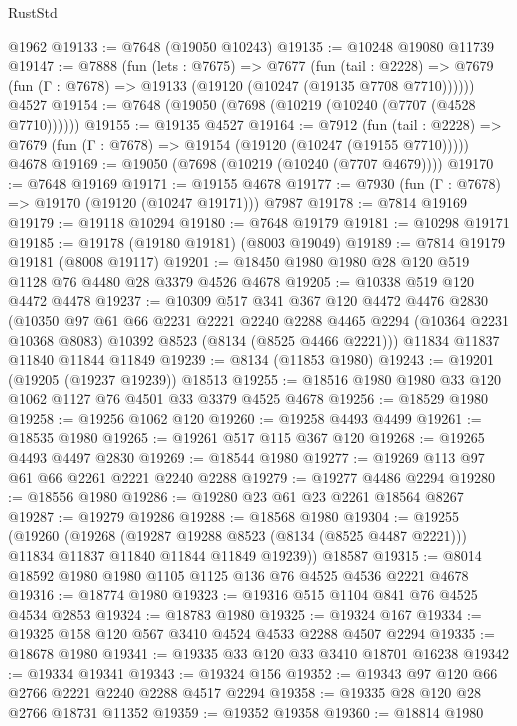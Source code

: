 \begin{lexlean}{RustStd}
\begin{coremodule}
    @1962
@19133 := @7648 (@19050 @10243)
@19135 := @10248 @19080 @11739
@19147 := @7888
    (fun (lets : @7675) =>
    @7677
      (fun (tail : @2228) =>
      @7679 (fun (Γ : @7678) => @19133 (@19120 (@10247 (@19135 @7708 @7710))))))
    @4527
@19154 := @7648 (@19050 (@7698 (@10219 (@10240 (@7707 (@4528 @7710))))))
@19155 := @19135 @4527
@19164 := @7912
    (fun (tail : @2228) => @7679 (fun (Γ : @7678) => @19154 (@19120 (@10247 (@19155 @7710)))))
    @4678
@19169 := @19050 (@7698 (@10219 (@10240 (@7707 @4679))))
@19170 := @7648 @19169
@19171 := @19155 @4678
@19177 := @7930 (fun (Γ : @7678) => @19170 (@19120 (@10247 @19171))) @7987
@19178 := @7814 @19169
@19179 := @19118 @10294
@19180 := @7648 @19179
@19181 := @10298 @19171
@19185 := @19178 (@19180 @19181) (@8003 @19049)
@19189 := @7814 @19179 @19181 (@8008 @19117)
@19201 := @18450 @1980 @1980 @28 @120 @519 @1128 @76 @4480 @28 @3379 @4526 @4678
@19205 := @10338 @519 @120 @4472 @4478
@19237 := @10309
    @517
    @341
    @367
    @120
    @4472
    @4476
    @2830
    (@10350
      @97
      @61
      @66
      @2231
      @2221
      @2240
      @2288
      @4465
      @2294
      (@10364 @2231 @10368 @8083)
      @10392
      @8523
      (@8134 (@8525 @4466 @2221)))
    @11834
    @11837
    @11840
    @11844
    @11849
@19239 := @8134 (@11853 @1980)
@19243 := @19201 (@19205 (@19237 @19239)) @18513
@19255 := @18516 @1980 @1980 @33 @120 @1062 @1127 @76 @4501 @33 @3379 @4525 @4678
@19256 := @18529 @1980
@19258 := @19256 @1062 @120
@19260 := @19258 @4493 @4499
@19261 := @18535 @1980
@19265 := @19261 @517 @115 @367 @120
@19268 := @19265 @4493 @4497 @2830
@19269 := @18544 @1980
@19277 := @19269 @113 @97 @61 @66 @2261 @2221 @2240 @2288
@19279 := @19277 @4486 @2294
@19280 := @18556 @1980
@19286 := @19280 @23 @61 @23 @2261 @18564 @8267
@19287 := @19279 @19286
@19288 := @18568 @1980
@19304 := @19255
    (@19260
      (@19268
        (@19287 @19288 @8523 (@8134 (@8525 @4487 @2221)))
        @11834
        @11837
        @11840
        @11844
        @11849
        @19239))
    @18587
@19315 := @8014 @18592 @1980 @1980 @1105 @1125 @136 @76 @4525 @4536 @2221 @4678
@19316 := @18774 @1980
@19323 := @19316 @515 @1104 @841 @76 @4525 @4534 @2853
@19324 := @18783 @1980
@19325 := @19324 @167
@19334 := @19325 @158 @120 @567 @3410 @4524 @4533 @2288 @4507 @2294
@19335 := @18678 @1980
@19341 := @19335 @33 @120 @33 @3410 @18701 @16238
@19342 := @19334 @19341
@19343 := @19324 @156
@19352 := @19343 @97 @120 @66 @2766 @2221 @2240 @2288 @4517 @2294
@19358 := @19335 @28 @120 @28 @2766 @18731 @11352
@19359 := @19352 @19358
@19360 := @18814 @1980

\end{coremodule}
\end{lexlean}
